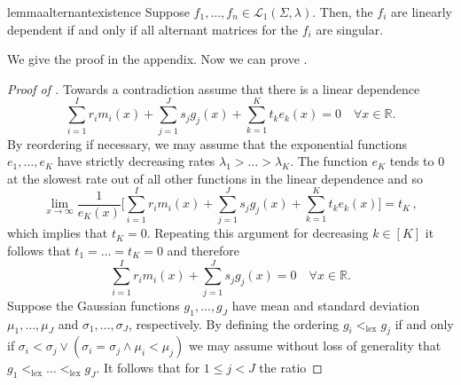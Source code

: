 \documentclass[a4paper,UKenglish,cleveref, autoref,mathscr]{lipics-v2019}
\newcommand{\RR}{\mathbb{R}}
\newcommand{\1}{\mathbbm{1}}
\begin{document}
\begin{restatable}{lemma}{alternantexistence}\label{alternantexistence}
Suppose $f_1, \dots, f_n \in \mathcal{L}_1(\Sigma, \lambda)$.
Then, the $f_i$ are linearly dependent if and only if all alternant matrices for the $f_i$ are singular.
\end{restatable}
We give the proof in the appendix.
Now we can prove .
\begin{proof}[Proof of ]
Towards a contradiction assume that  there is a linear dependence\begin{equation*}
\sum_{i = 1}^{I} r_i m_i(x) + \sum_{j = 1}^J s_j g_j(x) + \sum_{k = 1}^K t_k e_k(x) = 0 \quad \forall x \in \RR.
\end{equation*}
By reordering if necessary, we may assume that the exponential functions $e_1, \dots, e_K$ have strictly decreasing rates $\lambda_1 > \dots > \lambda_K$. The function $e_K$ tends to $0$ at the slowest rate out of all other functions in the linear dependence and so
\begin{equation*}
\lim_{x \rightarrow \infty}  \frac{1}{e_K(x)}\Big[\sum_{i = 1}^{I} r_i m_i(x) + \sum_{j = 1}^J s_j g_j(x) + \sum_{k = 1}^K t_k e_k(x)\Big] = t_K\,,
\end{equation*}
which implies that $t_K = 0$. Repeating this argument for decreasing $k \in [K]$ it follows that $t_1 = \dots = t_K = 0$ and therefore
\begin{equation*}
\sum_{i = 1}^{I} r_i m_i(x) + \sum_{j = 1}^J s_j g_j(x) = 0 \quad \forall x \in \RR.
\end{equation*}
Suppose the Gaussian functions $g_1, \dots, g_J$ have mean and standard deviation $\mu_1, \dots, \mu_J$ and $\sigma_1, \dots, \sigma_J$, respectively. By defining the ordering $g_i <_{\text{lex}} g_j$ if and only if $\sigma_i < \sigma_j \lor (\sigma_i = \sigma_j \land \mu_i < \mu_j)$ we may assume without loss of generality that $g_1 <_{\text{lex}} \dots <_{\text{lex}} g_J$. It follows that for $1 \leq j < J$ the ratio


\end{proof}
\end{document}

